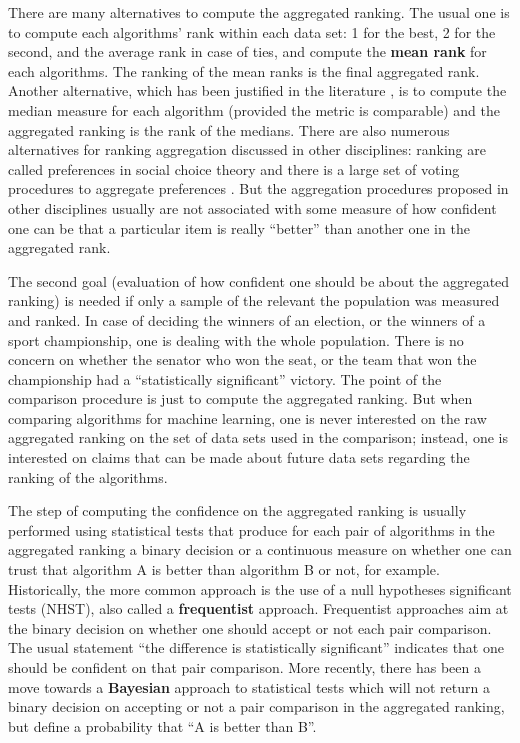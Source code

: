 \documentclass[twoside,11pt,preprint]{article}
\begin{document}
There are many alternatives to compute the aggregated ranking. The
usual one is to compute each algorithms' rank within each data set: 1
for the best, 2 for the second, and the average rank in case of ties,
and compute the \textbf{mean rank} for each algorithms. The ranking of the
mean ranks is the final aggregated rank. Another alternative, which
has been justified in the literature \citep{benavoli2016should, STAPOR2021107219}, is to compute the median measure
for each algorithm (provided the metric is comparable) and the
aggregated ranking is the rank of the medians. There are also
numerous alternatives for ranking aggregation discussed in other
disciplines: ranking are called preferences in social choice theory
and there is a large set of voting procedures to aggregate preferences
\citep{sep-social-choice}. But the aggregation procedures proposed in
other disciplines usually are not associated with some measure of how
confident one can be that a particular item is really ``better'' than
another one in the aggregated rank.

The second goal (evaluation of how confident one should be about the aggregated ranking)
is needed if only a sample of the relevant the population was
measured and ranked. In case of deciding the winners of an election,
or the winners of a sport championship, one is dealing
with the whole population. There is no concern on whether the senator
who won the seat, or the team that won the championship had a
``statistically significant'' victory. The point of the comparison
procedure is just to compute the aggregated ranking. But when
comparing algorithms for machine learning, one is never interested on
the raw aggregated ranking on the set of data sets used in the
comparison; instead, one is interested on claims that can be made
about future data sets regarding the ranking of the algorithms.

The step of computing the confidence on the aggregated ranking is
usually performed using statistical tests that produce for each pair
of algorithms in the aggregated ranking a binary decision or a
continuous measure on whether one can trust that algorithm A is
better than algorithm B or not, for example. Historically, the more common approach
is the use of a null hypotheses significant tests (NHST), also
called a \textbf{frequentist} approach. Frequentist approaches aim at the
binary decision on whether one should accept or not each pair
comparison. The usual statement ``the difference is
statistically significant'' indicates that one should be confident on
that pair comparison. More recently, there has been a move towards a
\textbf{Bayesian} approach to statistical tests which will not return a binary decision on
accepting or not a pair comparison in the aggregated ranking, but
define a probability that ``A is better than B''.
\end{document}
